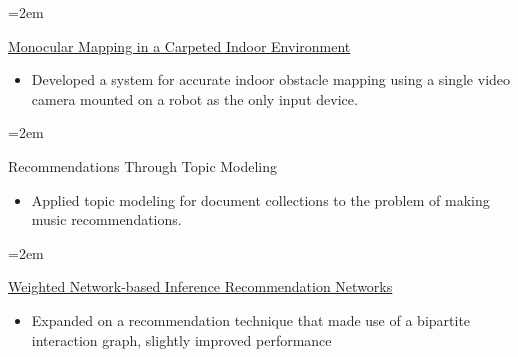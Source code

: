 \documentclass[a4paper]{scrartcl}
\newcommand{\NewSectionHeading}[1]{\noindent\color{blue}\spacedlowsmallcaps{#1}\vspace{1em}\color{Black}} %
\newcommand{\Description}[1]{\hangindent=2em\hangafter=0\noindent\raggedright\footnotesize{#1}\par\normalsize\vspace{1em}} %
\begin{document}
\begin{cv}{}
\vspace{0em} %


\NewSectionHeading{Cool Projects}

\Description{\href{http://www.cs.cornell.edu/Courses/cs4758/2013sp/final\%20project/hung_dang.pdf}{Monocular Mapping in a Carpeted Indoor Environment}
\begin{itemize}
\newcommand{\localtextbulletone}{\textcolor{blue}{\raisebox{0.40ex}{\rule{.6ex}{.6ex}}}}
\renewcommand{\labelitemi}{\localtextbulletone}
    \item Developed a system for accurate indoor obstacle mapping using a single video camera mounted on a robot as the only input device.
\end{itemize}}

\vspace{-0.5em} %

\Description{Recommendations Through Topic Modeling
\begin{itemize}
\newcommand{\localtextbulletone}{\textcolor{blue}{\raisebox{0.40ex}{\rule{.6ex}{.6ex}}}}
\renewcommand{\labelitemi}{\localtextbulletone}
    \item Applied topic modeling for document collections to the problem of making music recommendations.
\end{itemize}}

\vspace{-0.5em} %

\Description{\href{http://sohanjain.com/portfolio/jain-terkelsen-hundal-network-based-inference/}{Weighted Network-based Inference Recommendation Networks}
\begin{itemize}
\newcommand{\localtextbulletone}{\textcolor{blue}{\raisebox{0.40ex}{\rule{.6ex}{.6ex}}}}
\renewcommand{\labelitemi}{\localtextbulletone}
    \item Expanded on a recommendation technique that made use of a bipartite interaction graph, slightly improved performance
\end{itemize}}

\vspace{-0.5em} %


\end{cv}
\end{document}
